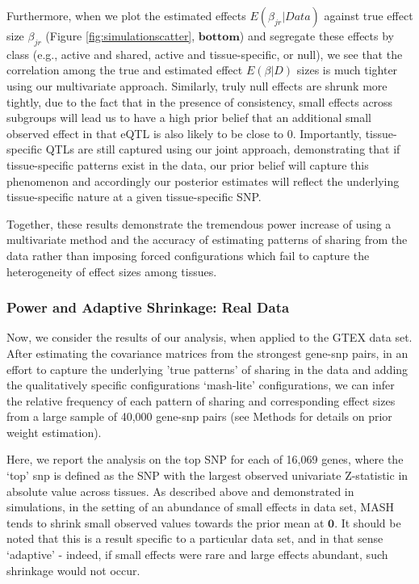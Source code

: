 Furthermore, when we plot the estimated effects $E(\beta_{jr}|Data)$ against true effect size $\beta_{jr}$ (Figure \ref{fig:simulationscatter}, $\textbf{bottom}$) and segregate these effects by class  (e.g., active and shared, active and tissue-specific, or null), we see that the correlation among the true and estimated effect $E(\beta|D)$ sizes is much tighter using our multivariate approach. Similarly, truly null effects are shrunk more tightly, due to the fact that in the presence of consistency, small effects across subgroups will lead us to have a high prior belief that an additional small observed effect in that eQTL is also likely to be close to 0. Importantly, tissue-specific QTLs are still captured using our joint approach, demonstrating that if tissue-specific patterns exist in the data, our prior belief will capture this phenomenon and accordingly our posterior estimates will reflect the underlying tissue-specific nature at a given tissue-specific SNP.

Together, these results demonstrate the tremendous power increase of using a multivariate method and the accuracy of estimating patterns of sharing from the data rather than imposing forced configurations which fail to capture the heterogeneity of effect sizes among tissues.


\subsubsection{Power and Adaptive Shrinkage: Real Data}

Now, we consider the results of our analysis, when applied to the GTEX data set. After estimating the covariance matrices from the strongest gene-snp pairs, in an effort to capture the underlying 'true patterns' of sharing in the data and adding the qualitatively specific configurations `mash-lite' configurations, we can infer the relative frequency of each pattern of sharing and corresponding effect sizes from a large sample of 40,000 gene-snp pairs (see Methods for details on prior weight estimation).

Here, we report the analysis on the top SNP for each of 16,069 genes, where the `top' snp is defined as the SNP with the largest observed univariate Z-statistic in absolute value across tissues. As described above and demonstrated in simulations, in the setting of an abundance of small effects in data set, MASH tends to shrink small observed values towards the prior mean at $\bm{0}$. It should be noted that this is a result specific to a particular data set, and in that sense `adaptive' - indeed, if small effects were rare and large effects abundant, such shrinkage would not occur. 

